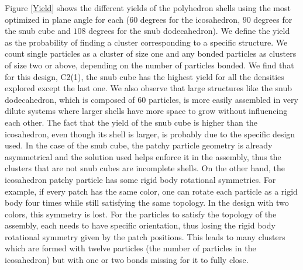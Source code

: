 \documentclass[a4paper, amsfonts, amssymb, amsmath, reprint, showkeys, nofootinbib, twoside]{revtex4-1}
\begin{document}
Figure \ref{Yield} shows the different yields of the polyhedron shells using the most optimized in plane angle for each ($60$ degrees for the icosahedron, $90$ degrees for the snub cube and $108$ degrees for the snub dodecahedron). We define the yield as the probability of finding a cluster corresponding to a specific structure. We count single particles as a cluster of size one and any bonded particles as clusters of size two or above, depending on the number of particles bonded. We find that for this design, C2(1), the snub cube has the highest yield for all the densities explored except the last one. We also observe that large structures like the snub dodecahedron, which is composed of $60$ particles, is more easily assembled in very dilute systems where larger shells have more space to grow without influencing each other. The fact that the yield of the snub cube is higher than the icosahedron, even though its shell is larger, is probably due to the specific design used. In the case of the snub cube, the patchy particle geometry is already asymmetrical and the solution used helps enforce it in the assembly, thus the clusters that are not snub cubes are incomplete shells. On the other hand, the icosahedron patchy particle has some rigid body rotational symmetries. For example, if every patch has the same color, one can rotate each particle as a rigid body four times while still satisfying the same topology. In the design with two colors, this symmetry is lost. For the particles to satisfy the topology of the assembly, each needs to have specific orientation, thus losing the rigid body rotational symmetry given by the patch positions. This leads to many clusters which are formed with twelve particles (the number of particles in the icosahedron) but with one or two bonds missing for it to fully close. 
\end{document}
